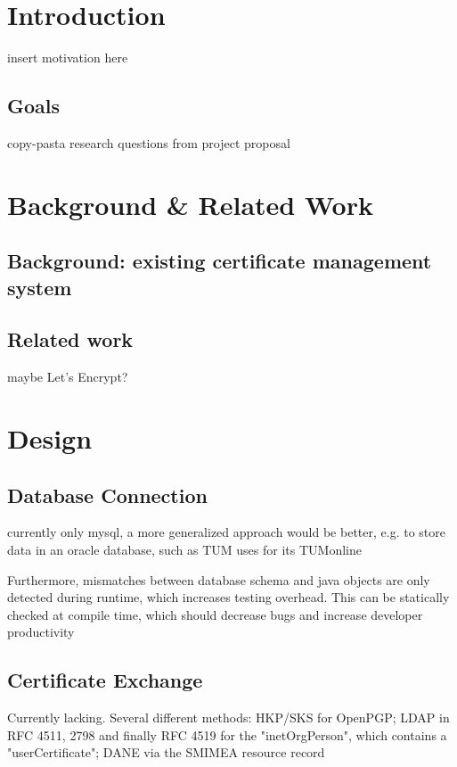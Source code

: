 \chapter{Introduction}
insert motivation here
\section{Goals}
copy-pasta research questions from project proposal

\chapter{Background \& Related Work}
\section{Background: existing certificate management system}

\section{Related work}
maybe Let's Encrypt?

\chapter{Design}

\section{Database Connection}
currently only mysql, a more generalized approach would be better, e.g. to store data in an oracle database, such as TUM
uses for its TUMonline

Furthermore, mismatches between database schema and java objects are only detected during runtime, which increases
testing overhead. This can be statically checked at compile time, which should decrease bugs and increase developer
productivity

\section{Certificate Exchange}
Currently lacking. Several different methods:
HKP/SKS for OpenPGP;
LDAP in RFC 4511, 2798 and finally RFC 4519 for the "inetOrgPerson", which contains a "userCertificate";
DANE via the SMIMEA resource record

